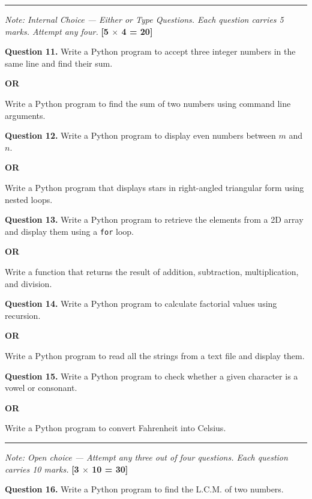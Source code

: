 \documentclass[11pt,a4paper]{article}
\begin{document}
\bigskip


\rule{\linewidth}{0.4pt}\smallskip




\noindent   \textit{Note: Internal Choice --- Either or Type Questions. Each question carries 5 marks. Attempt any four.} \hfill   \textbf{[5 $ \times$ 4 = 20]}

\medskip


\noindent   \textbf{Question 11.} Write a Python program to accept three integer numbers in the same line and find their sum.
\centerline{   \textbf{OR}}
Write a Python program to find the sum of two numbers using command line arguments.

\medskip


\noindent   \textbf{Question 12.} Write a Python program to display even numbers between $m$ and $n$.
\centerline{   \textbf{OR}}
Write a Python program that displays stars in right-angled triangular form using nested loops.

\medskip


\noindent   \textbf{Question 13.} Write a Python program to retrieve the elements from a 2D array and display them using a   \texttt{for} loop.
\centerline{   \textbf{OR}}
Write a function that returns the result of addition, subtraction, multiplication, and division.

\medskip


\noindent   \textbf{Question 14.} Write a Python program to calculate factorial values using recursion.
\centerline{   \textbf{OR}}
Write a Python program to read all the strings from a text file and display them.

\medskip


\noindent   \textbf{Question 15.} Write a Python program to check whether a given character is a vowel or consonant.
\centerline{   \textbf{OR}}
Write a Python program to convert Fahrenheit into Celsius.

\bigskip


\rule{\linewidth}{0.4pt}\smallskip




\noindent   \textit{Note: Open choice --- Attempt any three out of four questions. Each question carries 10 marks.} \hfill   \textbf{[3 $ \times$ 10 = 30]}

\medskip


\noindent   \textbf{Question 16.} Write a Python program to find the L.C.M. of two numbers.
\end{document}
